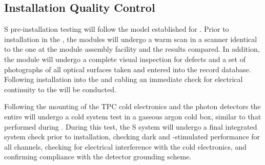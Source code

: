 \subsection{Installation Quality Control}
\label{sec:fdsp-pd-installqc}

S pre-installation testing will follow the model established for .  Prior to installation in the , the  modules will undergo a warm scan in a scanner identical to the one at the  module assembly facility and the results compared.  In addition, the module will undergo a complete visual inspection for defects and a set of photographs of all optical surfaces taken and entered into the  record database.  Following installation into the  and cabling an immediate check for electrical continuity to the  will be conducted.

Following the mounting of the TPC cold electronics and the photon detectors the entire  will undergo a cold system test in a gaseous argon cold box, similar to that performed during .  During this test, the S system will undergo a final integrated system check prior to installation, checking dark and -stimulated  performance for all channels, checking for electrical interference with the cold electronics, and confirming compliance with the detector grounding scheme.